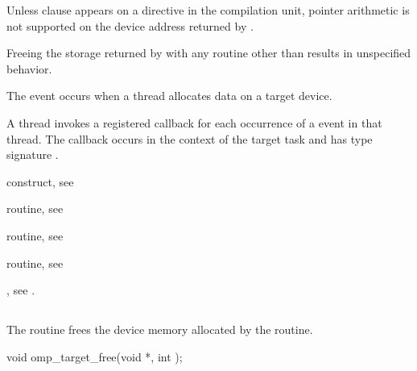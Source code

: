 \begin{ccppspecific}
Unless  clause appears on a 
directive in the compilation unit, pointer arithmetic is not supported
on the device address returned by .
\end{ccppspecific}

Freeing the storage returned by  with any routine
other than  results in unspecified behavior.

\events
The  event occurs when a thread allocates 
data on a target device.

\tools
A thread invokes a registered 
callback for each occurrence of a  event in that thread.
The callback occurs in the context of the target task and has type signature
.

\begin{crossrefs}
\item {} construct, see

\item {} routine, see

\item {} routine, see

\item {} routine, see

\item {}, see
.
\end{crossrefs}



\subsection{}
\label{subsec:omp_target_free}
\summary
The  routine frees the device memory allocated 
by the  routine.

\format
\begin{ccppspecific}
\begin{ompcFunction}
void omp_target_free(void *, int );
\end{ompcFunction}
\end{ccppspecific}

